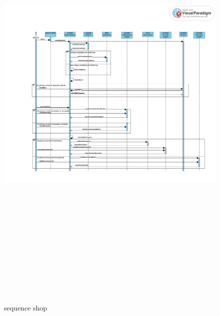 \begin{figure}[!htb]
    \includegraphics[width=20cm,height=22cm]{sequence_shop.png}
    \caption{sequence shop}
    \label{}
\end{figure}
